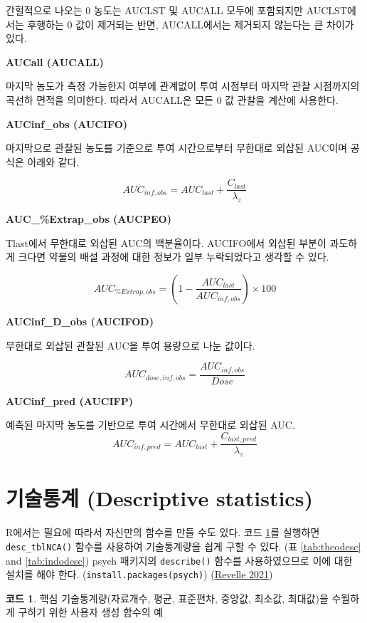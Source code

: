 \documentclass[
  11pt,
  krantz2, a4paper, twoside]{krantz}
\theoremstyle{definition}
\theoremstyle{definition}
\newtheorem{example}{코드}[chapter]
\theoremstyle{definition}
\theoremstyle{definition}
\theoremstyle{remark}
\begin{document}
간헐적으로 나오는 0 농도는 AUCLST 및 AUCALL 모두에 포함되지만 AUCLST에서는 후행하는 0 값이 제거되는 반면, AUCALL에서는 제거되지 않는다는 큰 차이가 있다.

\textbf{AUCall (AUCALL)}

마지막 농도가 측정 가능한지 여부에 관계없이 투여 시점부터 마지막 관찰 시점까지의 곡선하 면적을 의미한다. 따라서 AUCALL은 모든 0 값 관찰을 계산에 사용한다.

\textbf{AUCinf\_obs (AUCIFO)}

마지막으로 관찰된 농도를 기준으로 투여 시간으로부터 무한대로 외삽된 AUC이며 공식은 아래와 같다.

\[AUC_{inf,obs} = AUC_{last} + \frac{C_{last}}{\lambda_{z}}\]

\textbf{AUC\_\%Extrap\_obs (AUCPEO)}

Tlast에서 무한대로 외삽된 AUC의 백분율이다. AUCIFO에서 외삽된 부분이 과도하게 크다면 약물의 배설 과정에 대한 정보가 일부 누락되었다고 생각할 수 있다.

\[AUC_{\% Extrap,obs} = (1 - \frac{AUC_{last}}{AUC_{inf,obs}}) \times 100\]

\textbf{AUCinf\_D\_obs (AUCIFOD)}

무한대로 외삽된 관찰된 AUC을 투여 용량으로 나눈 값이다.

\[AUC_{dose,inf,obs} = \frac{AUC_{inf,obs}}{Dose}\]

\textbf{AUCinf\_pred (AUCIFP)}

예측된 마지막 농도를 기반으로 투여 시간에서 무한대로 외삽된 AUC.
\[AUC_{inf,pred} = AUC_{last} + \frac{C_{last,pred}}{\lambda_{z}}\]

\hypertarget{uxae30uxc220uxd1b5uxacc4-descriptive-statistics}{%
\section{기술통계 (Descriptive statistics)}\label{uxae30uxc220uxd1b5uxacc4-descriptive-statistics}}


R에서는 필요에 따라서 자신만의 함수를 만들 수도 있다.
코드 \ref{exm:desctblnca}를 실행하면 \texttt{desc\_tblNCA()} 함수를 사용하여 기술통계량을 쉽게 구할 수 있다. (표 \ref{tab:theodesc} and \ref{tab:indodesc})
psych 패키지의 \texttt{describe()} 함수를 사용하였으므로 이에 대한 설치를 해야 한다. (\texttt{install.packages(\textquotesingle{}psych\textquotesingle{})}) (\protect\hyperlink{ref-R-psych}{Revelle 2021})

\begin{example}
\protect\hypertarget{exm:desctblnca}{}\label{exm:desctblnca}핵심 기술통계량(자료개수, 평균, 표준편차, 중앙값, 최소값, 최대값)을 수월하게 구하기 위한 사용자 생성 함수의 예
\end{example}
\end{document}
